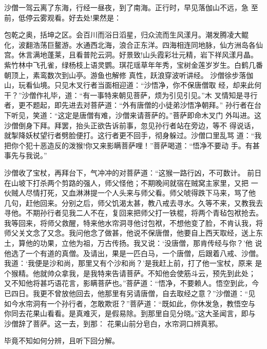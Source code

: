 沙僧一驾云离了东海，行经一昼夜，到了南海。正行时，早见落伽山不远，急
至前，低停云雾观看。好去处!果然是：

包乾之奥，括坤之区。会百川而浴日滔星，归众流而生风漾月。潮发腾凌大鲲
化，波翻浩荡巨鳌游。水通西北海，浪合正东洋。四海相连同地脉，仙方洲岛各仙
宫。休言满地蓬莱，且看普陀云洞。好景致!山头霞彩壮元精，岩下祥风漾月晶。
紫竹林中飞孔雀，绿杨枝上语灵鹦。琪花瑶草年年秀，宝树金莲岁岁生。白鹤几番
朝顶上，素鸾数次到山亭。游鱼也解修
真性，跃浪穿波听讲经。
沙僧徐步落伽山，玩看仙境。只见木叉行者当面相迎道：“沙悟净，你不保唐僧取
经，却来此何干？”沙僧作礼毕，道：“有一事特来朝见菩萨，烦为引见引见。”木
叉情知是寻行者，更不题起，即先进去对菩萨道：“外有唐僧的小徒弟沙悟净朝拜。”
孙行者在台下听见，笑道：“这定是唐僧有难，沙僧来请菩萨的。”菩萨即命木叉门
外叫进。这沙僧倒身下拜。拜罢，抬头正欲告诉前事，忽见孙行者站在旁边，等不
得说话，就掣降妖杖望行者劈脸便打。这行者更不回手，彻身躲过。沙僧口里乱骂
道：“我把你个犯十恶造反的泼猴!你又来影瞒菩萨哩！”菩萨喝道：“悟净不要动
手。有甚事先与我说。”

沙僧收了宝杖，再拜台下，气冲冲的对菩萨道：“这猴一路行凶，不可数计。
前日在山坡下打杀两个剪路的强人，师父怪他；不期晚间就宿在贼窝主家里，又把
一伙贼人尽情打死，又血淋淋提一个人头来与师父看。师父唬得跌下马来，骂了他
几句，赶他回来。分别之后，师父饥渴太甚，教八戒去寻水。久等不来，又教我去
寻他。不期孙行者见我二人不在，复回来把师父打一铁棍，将两个青毡包袱抢去。
我等回来，将师父救醒，特来他水帘洞寻他讨包袱，不想他变了脸，不肯认我，将
师父关文念了又念。我问他念了做甚，他说不保唐僧，他要自上西天取经，送上东
土，算他的功果，立他为祖，万古传扬。我又说：‘没唐僧，那肯传经与你？’他
说他选了一个有道的真僧。及请出，果是一匹白马，一个唐僧，后跟着八戒、沙僧。
我道：‘我便是沙和尚，那里又有个沙和尚？’是我赶上前，打了他一宝杖，原来
是个猴精。他就帅众拿我，是我特来告请菩萨。不知他会使筋斗云，预先到此处；
又不知他将甚巧语花言，影瞒菩萨也。”菩萨道：“悟净，不要赖人。悟空到此，今
已四日。我更不曾放他回去，他那里有另请唐僧，自去取经之意？”沙僧道：“见
如今水帘洞有一个孙行者，怎敢欺诳？”菩萨道：“既如此，你休发急，教悟空与
你同去花果山看看。是真难灭，是假易除。到那里自见分晓。”这大圣闻言，即与
沙僧辞了菩萨。这一去，到那：
花果山前分皂白，水帘洞口辨真邪。

毕竟不知如何分辨，且听下回分解。